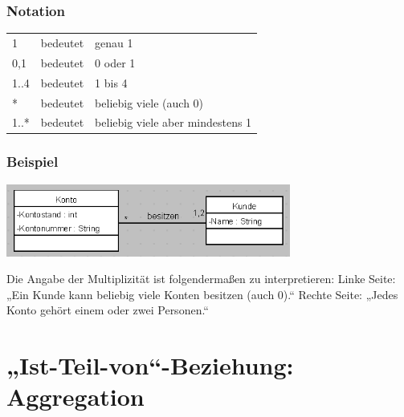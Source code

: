 \subsubsection{Notation}

\begin{tabular}{lll}
1       & bedeutet & genau 1\\
0,1     & bedeutet & 0 oder 1\\
1..4    & bedeutet & 1 bis 4\\
{}*     & bedeutet & beliebig viele (auch 0)\\
1..*    & bedeutet & beliebig viele aber mindestens 1\\
\end{tabular}

\subsubsection{Beispiel}

\includegraphics[width=0.7\textwidth]{./inf/SEKII/15_UML_Klassendiagramme/Multiplizitaet.png}

Die Angabe der Multiplizität ist folgendermaßen zu interpretieren:
Linke Seite: „Ein Kunde kann beliebig viele Konten besitzen (auch 0).“
Rechte Seite: „Jedes Konto gehört einem oder zwei Personen.“


\section{„Ist-Teil-von“-Beziehung: Aggregation}


